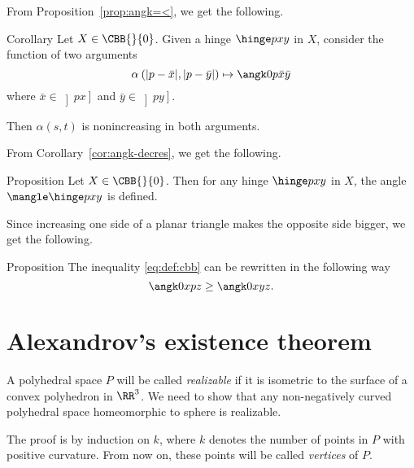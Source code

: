 From Proposition~\ref{prop:angk=<}, we get the following.

\begin{thm}{Corollary}\label{cor:angk-decres}
Let $X\in\CBB{}{0}$.
Given a hinge $\hinge p x y$ in $X$, consider the function of two arguments
$$\alpha\:(|p-\bar x|,|p-\bar y|)\mapsto\angk0 p {\bar x}{\bar y}$$
where 
$\bar x\in\left ]p x\right]$ and $\bar y\in\left]p y\right]$.

Then $\alpha(s,t)$ is nonincreasing in both arguments.
\end{thm}

From Corollary~\ref{cor:angk-decres}, we get the following.

\begin{thm}{Proposition}\label{prop:angle-mono}
Let $X\in\CBB{}{0}$.
Then for any hinge $\hinge p x y$ in $X$, the angle $\mangle\hinge p x y$ is defined.
\end{thm}











Since increasing one side of a planar triangle makes the opposite side bigger,
we get the following.

\begin{thm}{Proposition}\label{prop:angk=<}
The inequality \ref{eq:def:cbb} can be rewritten in the following way
\[
\angk0 x p z
\ge
\angk0 x y z.
\]

\end{thm}
















\section{Alexandrov's existence theorem}


A polyhedral space $P$ will be called \emph{realizable}
if it is isometric to the surface of a convex polyhedron in $\RR^3$.
We need to show that
any non-negatively curved polyhedral space homeomorphic to sphere is realizable.

The proof is by induction on $k$,
where $k$ denotes the number of points in $P$ with positive curvature.
From now on, these points will be called \emph{vertices} of $P$.

